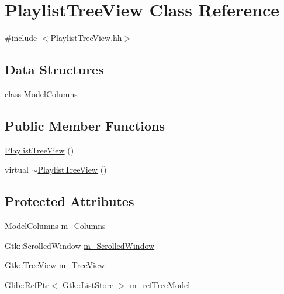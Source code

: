 \hypertarget{classPlaylistTreeView}{
\section{\-Playlist\-Tree\-View \-Class \-Reference}
\label{classPlaylistTreeView}
}


{\ttfamily \#include $<$\-Playlist\-Tree\-View.\-hh$>$}

\subsection*{\-Data \-Structures}
\begin{DoxyCompactItemize}
\item 
class \hyperlink{classPlaylistTreeView_1_1ModelColumns}{\-Model\-Columns}
\end{DoxyCompactItemize}
\subsection*{\-Public \-Member \-Functions}
\begin{DoxyCompactItemize}
\item 
\hyperlink{classPlaylistTreeView_ad8c1c34bbfdec59b449b8e015ca0914a}{\-Playlist\-Tree\-View} ()
\item 
virtual \hyperlink{classPlaylistTreeView_a691621269697bd8e7b8e3dc1cf4e4d12}{$\sim$\-Playlist\-Tree\-View} ()
\end{DoxyCompactItemize}
\subsection*{\-Protected \-Attributes}
\begin{DoxyCompactItemize}
\item 
\hyperlink{classPlaylistTreeView_1_1ModelColumns}{\-Model\-Columns} \hyperlink{classPlaylistTreeView_a8e28de0bad495207b343ae862dca7215}{m\-\_\-\-Columns}
\item 
\-Gtk\-::\-Scrolled\-Window \hyperlink{classPlaylistTreeView_ad3b445e2a03227bd5dc93ce4badd5647}{m\-\_\-\-Scrolled\-Window}
\item 
\-Gtk\-::\-Tree\-View \hyperlink{classPlaylistTreeView_af386b889e73bc16364f33eb760b08606}{m\-\_\-\-Tree\-View}
\item 
\-Glib\-::\-Ref\-Ptr$<$ \-Gtk\-::\-List\-Store $>$ \hyperlink{classPlaylistTreeView_a8c489fb9e0542fed6a5465a4afc91714}{m\-\_\-ref\-Tree\-Model}
\end{DoxyCompactItemize}


